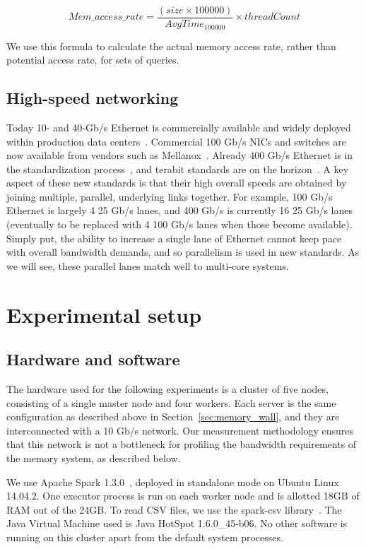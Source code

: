 \documentclass[9pt]{sig-alternate-05-2015}
\begin{document}
\begin{equation}
Mem\_access\_rate =  \frac{(size \times 100000)}{AvgTime_{100000}} \times threadCount
\label{eqn:membw}
\end{equation}

We use this formula to calculate the actual memory access rate, rather than
potential access rate, for sets of queries.

\subsection{High-speed networking}

Today 10- and 40-Gb/s Ethernet is commercially available and widely deployed
within production data centers~\cite{fb-dc}.  Commercial 100 Gb/s NICs and
switches are now available from vendors such as Mellanox~\cite{mellanox100g}.
Already 400 Gb/s Ethernet is in the standardization
process~\cite{ethernet400g}, and terabit standards are on the
horizon~\cite{terabitethernet}.  A key aspect of these new standards is that
their high overall speeds are obtained by joining multiple, parallel,
underlying links together.  For example, 100 Gb/s Ethernet is largely 4 25 Gb/s
lanes, and 400 Gb/s is currently 16 25 Gb/s lanes (eventually to be replaced
with 4 100 Gb/s lanes when those become available).  Simply put, the ability to
increase a single lane of Ethernet cannot keep pace with overall bandwidth
demands, and so parallelism is used in new standards.  As we will see, these
parallel lanes match well to multi-core systems.

\section{Experimental setup}

\subsection{Hardware and software}

The hardware used for the following experiments is a cluster of five nodes,
consisting of a single master node and four workers. Each server is the same
configuration as described above in Section~\ref{sec:memory_wall}, and they are
interconnected with a 10 Gb/s network.  Our measurement methodology ensures
that this network is not a bottleneck for profiling the bandwidth requirements
of the memory system, as described below.

We use Apache Spark 1.3.0~\cite{sparkUrl}, deployed in standalone mode on
Ubuntu Linux 14.04.2.  One executor process is run on each worker node and is
allotted 18GB of RAM out of the 24GB. To read CSV files, we use the spark-csv
library~\cite{sparkCsv}. The Java Virtual Machine used is Java HotSpot
1.6.0\_45-b06.  No other software is running on this cluster apart from the
default system processes.
\end{document}
